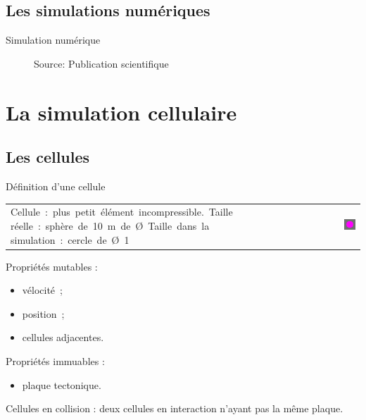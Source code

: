 \documentclass{beamer}
\begin{document}
\subsection{Les simulations numériques}
\begin{frame}{Simulation numérique}
  \begin{center}
    \begin{figure}
      \caption{Source: Publication scientifique}
    \end{figure}
  \end{center}
\end{frame}

\section{La simulation cellulaire}

\subsection{Les cellules}
\begin{frame}{Définition d'une cellule}
  \begin{tabular}{m{8cm}m{1cm}m{2cm}}
    \mbox{Cellule : plus petit élément incompressible. Taille}
    \mbox{réelle : sphère de 10 m de Ø Taille dans la}
    \mbox{simulation : cercle de Ø 1} &&
    \includegraphics[width=1.5cm]{Images/cellule.png}
  \end{tabular}
  Propriétés mutables :
  \begin{itemize}
   \item vélocité~;
   \item position~;
   \item cellules adjacentes.
  \end{itemize}
  Propriétés immuables :
  \begin{itemize}
   \item plaque tectonique.\\
  \end{itemize}
  \smallbreak
  Cellules en collision : deux cellules en interaction n'ayant pas la même plaque.
\end{frame}
\end{document}
